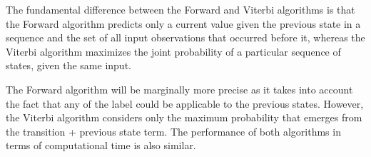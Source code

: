 \documentclass[parskip=half]{scrartcl}
\begin{document}
            The fundamental difference between the Forward and Viterbi algorithms is that the Forward algorithm predicts only a current value given the previous state in a sequence and the set of all input observations that occurred before it, whereas the Viterbi algorithm maximizes the joint probability of a particular sequence of states, given the same input. 

            The Forward algorithm will be marginally more precise as it takes into account the fact that any of the label could be applicable to the previous states. However, the Viterbi algorithm considers only the maximum probability that emerges from the transition + previous state term. The performance of both algorithms in terms of computational time is also similar.
        

    

\end{document}
